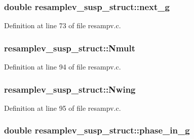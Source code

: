 \subsubsection[{\texorpdfstring{next\+\_\+g}{next_g}}]{\setlength{\rightskip}{0pt plus 5cm}double resamplev\+\_\+susp\+\_\+struct\+::next\+\_\+g}\hypertarget{structresamplev__susp__struct_ad3d36551625f7c95640b793535aba9fa}{}\label{structresamplev__susp__struct_ad3d36551625f7c95640b793535aba9fa}


Definition at line 73 of file resampv.\+c.

\subsubsection[{\texorpdfstring{Nmult}{Nmult}}]{ resamplev\+\_\+susp\+\_\+struct\+::\+Nmult}\hypertarget{structresamplev__susp__struct_ac9838c8c74ced6f149e926cdb75ffb04}{}\label{structresamplev__susp__struct_ac9838c8c74ced6f149e926cdb75ffb04}


Definition at line 94 of file resampv.\+c.

\subsubsection[{\texorpdfstring{Nwing}{Nwing}}]{ resamplev\+\_\+susp\+\_\+struct\+::\+Nwing}\hypertarget{structresamplev__susp__struct_a81a1e26c05be0c80e452b835785bce73}{}\label{structresamplev__susp__struct_a81a1e26c05be0c80e452b835785bce73}


Definition at line 95 of file resampv.\+c.

\subsubsection[{\texorpdfstring{phase\+\_\+in\+\_\+g}{phase_in_g}}]{\setlength{\rightskip}{0pt plus 5cm}double resamplev\+\_\+susp\+\_\+struct\+::phase\+\_\+in\+\_\+g}\hypertarget{structresamplev__susp__struct_ac58338da86c7d858620ddc0eda4a48fb}{}\label{structresamplev__susp__struct_ac58338da86c7d858620ddc0eda4a48fb}


